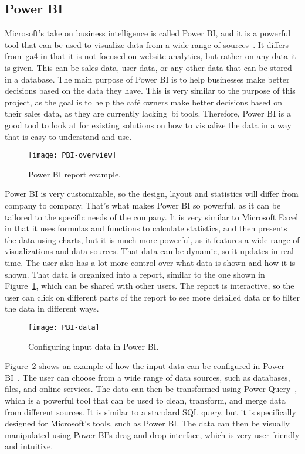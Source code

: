 \subsection{Power BI}\label{subsec:power-bi}

Microsoft's take on business intelligence is called Power BI, and it is a powerful tool that can be used to visualize
data from a wide range of sources~\cite{power-bi}.
It differs from~\acrshort{ga4} in that it is not focused on website analytics, but rather on any data it is given.
This can be sales data, user data, or any other data that can be stored in a database.
The main purpose of Power BI is to help businesses make better decisions based on the data they have.
This is very similar to the purpose of this project, as the goal is to help the café owners make better decisions based
on their sales data, as they are currently lacking~\acrlong{bi} tools.
Therefore, Power BI is a good tool to look at for existing solutions on how to visualize the data in a way that is easy
to understand and use.

\begin{figure}[H]
    \centering
    \texttt{[image: PBI-overview]}
    \caption{Power BI report example.
    }\label{fig:PBI-overview}
\end{figure}

Power BI is very customizable, so the design, layout and statistics will differ from company to company.
That's what makes Power BI so powerful, as it can be tailored to the specific needs of the company.
It is very similar to Microsoft Excel in that it uses formulas and functions to calculate statistics, and then presents
the data using charts, but it is much more powerful, as it features a wide range of visualizations and data sources.
That data can be dynamic, so it updates in real-time.
The user also has a lot more control over what data is shown and how it is shown.
That data is organized into a report, similar to the one shown in Figure~\ref{fig:PBI-overview}, which can be shared
with other users.
The report is interactive, so the user can click on different parts of the report to see more detailed data or to
filter the data in different ways.

\begin{figure}[H]
    \centering
    \texttt{[image: PBI-data]}
    \caption{Configuring input data in Power BI.\@
    }\label{fig:PBI-data}
\end{figure}

Figure~\ref{fig:PBI-data} shows an example of how the input data can be configured in Power BI~\cite{power-bi}.
The user can choose from a wide range of data sources, such as databases, files, and online services.
The data can then be transformed using Power Query~\cite{power-query}, which is a powerful tool that can be used to
clean, transform, and merge data from different sources.
It is similar to a standard SQL query, but it is specifically designed for Microsoft's tools, such as Power BI.\@
The data can then be visually manipulated using Power BI's drag-and-drop interface, which is very user-friendly and
intuitive.

